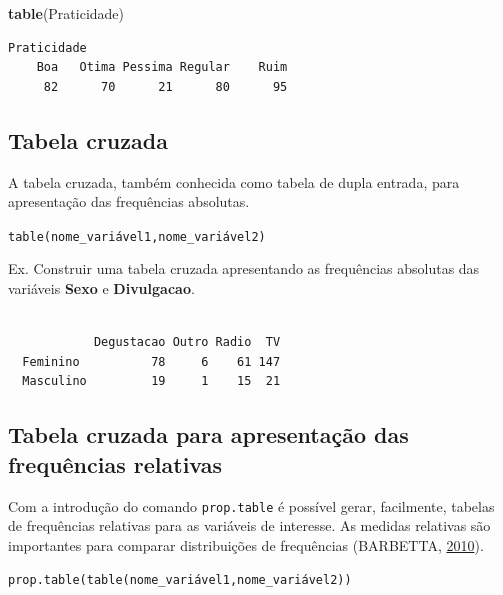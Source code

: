 \documentclass[12pt,portuguese,oneside]{book}
\newenvironment{Shaded}{\begin{snugshade}}{\end{snugshade}}
\newcommand{\KeywordTok}[1]{\textcolor[rgb]{0.13,0.29,0.53}{\textbf{#1}}}
\newcommand{\OperatorTok}[1]{\textcolor[rgb]{0.81,0.36,0.00}{\textbf{#1}}}
\newcommand{\NormalTok}[1]{#1}
\begin{document}
\begin{Shaded}
\begin{Highlighting}[]
\KeywordTok{table}\NormalTok{(Praticidade)}
\end{Highlighting}
\end{Shaded}

\begin{verbatim}
Praticidade
    Boa   Otima Pessima Regular    Ruim 
     82      70      21      80      95 
\end{verbatim}

\subsection{Tabela cruzada}\label{tabela-cruzada}

A tabela cruzada, também conhecida como tabela de dupla entrada, para
apresentação das frequências absolutas.

\texttt{table(nome\_variável1,nome\_variável2)}

Ex. Construir uma tabela cruzada apresentando as frequências absolutas
das variáveis \textbf{Sexo} e \textbf{Divulgacao}.

\begin{Shaded}
\end{Shaded}

\begin{verbatim}
           
            Degustacao Outro Radio  TV
  Feminino          78     6    61 147
  Masculino         19     1    15  21
\end{verbatim}

\subsection{Tabela cruzada para apresentação das frequências
relativas}\label{tabela-cruzada-para-apresentacao-das-frequencias-relativas}

Com a introdução do comando \texttt{prop.table} é possível gerar,
facilmente, tabelas de frequências relativas para as variáveis de
interesse. As medidas relativas são importantes para comparar
distribuições de frequências (BARBETTA,
\protect\hyperlink{ref-barbetta1988}{2010}).

\texttt{prop.table(table(nome\_variável1,nome\_variável2))}
\end{document}
